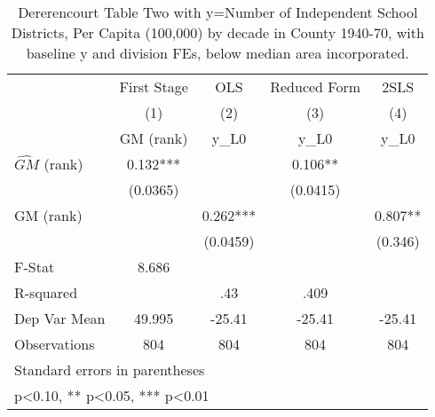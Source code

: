\begin{table}[htbp]\centering
\def\sym#1{\ifmmode^{#1}\else\(^{#1}\)\fi}
\caption{Dererencourt Table Two with y=Number of Independent School Districts, Per Capita (100,000) by decade in County 1940-70, with baseline y and division FEs, below median area incorporated.}
\begin{tabular}{l*{4}{c}}
\toprule
                    & First Stage   &         OLS   &Reduced Form   &        2SLS   \\
                    &\multicolumn{1}{c}{(1)}&\multicolumn{1}{c}{(2)}&\multicolumn{1}{c}{(3)}&\multicolumn{1}{c}{(4)}\\
                    &\multicolumn{1}{c}{GM  (rank)}&\multicolumn{1}{c}{y\_L0}&\multicolumn{1}{c}{y\_L0}&\multicolumn{1}{c}{y\_L0}\\
\midrule
$\hat{GM}$ (rank)   &       0.132***&               &       0.106** &               \\
                    &    (0.0365)   &               &    (0.0415)   &               \\
\addlinespace
GM  (rank)          &               &       0.262***&               &       0.807** \\
                    &               &    (0.0459)   &               &     (0.346)   \\
\midrule
F-Stat              &       8.686   &               &               &               \\
R-squared           &               &         .43   &        .409   &               \\
Dep Var Mean        &      49.995   &      -25.41   &      -25.41   &      -25.41   \\
Observations        &         804   &         804   &         804   &         804   \\
\bottomrule
\multicolumn{5}{l}{\footnotesize Standard errors in parentheses}\\
\multicolumn{5}{l}{\footnotesize * p<0.10, ** p<0.05, *** p<0.01}\\
\end{tabular}
\end{table}
